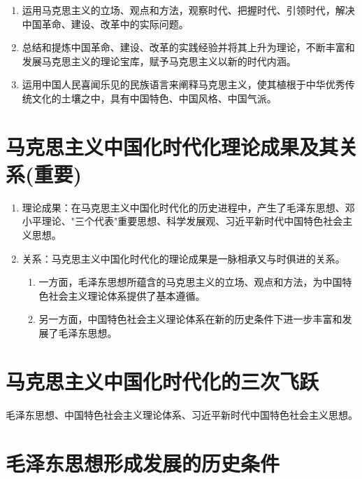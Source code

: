 \documentclass[12pt, a4paper, oneside]{ctexbook}
\begin{document}
\begin{enumerate}[label=（\arabic*）]
\item 运用马克思主义的立场、观点和方法，观察时代、把握时代、引领时代，解决中国革命、建设、改革中的实际问题。

\item 总结和提炼中国革命、建设、改革的实践经验并将其上升为理论，不断丰富和发展马克思主义的理论宝库，赋予马克思主义以新的时代内涵。

\item 运用中国人民喜闻乐见的民族语言来阐释马克思主义，使其植根于中华优秀传统文化的土壤之中，具有中国特色、中国风格、中国气派。
\end{enumerate}

\section{马克思主义中国化时代化理论成果及其关系(重要)}

\begin{enumerate}[label=（\arabic*）]
\item 理论成果：在马克思主义中国化时代化的历史进程中，产生了毛泽东思想、邓小平理论、"三个代表"重要思想、科学发展观、习近平新时代中国特色社会主义思想。

\item 关系：马克思主义中国化时代化的理论成果是一脉相承又与时俱进的关系。

\begin{enumerate}[label=（\roman*）]
\item 一方面，毛泽东思想所蕴含的马克思主义的立场、观点和方法，为中国特色社会主义理论体系提供了基本遵循。

\item 另一方面，中国特色社会主义理论体系在新的历史条件下进一步丰富和发展了毛泽东思想。
\end{enumerate}
\end{enumerate}

\section{马克思主义中国化时代化的三次飞跃}

毛泽东思想、中国特色社会主义理论体系、习近平新时代中国特色社会主义思想。

\section{毛泽东思想形成发展的历史条件}
\end{document}
